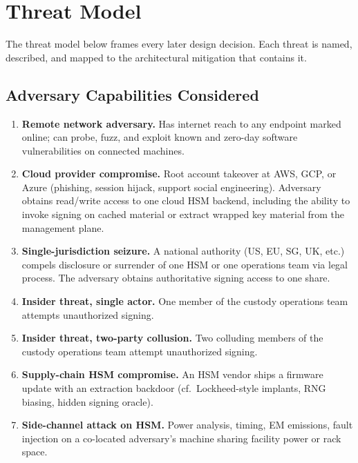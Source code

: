 \section{Threat Model}

\label{sec:threat}

The threat model below frames every later design decision. Each
threat is named, described, and mapped to the architectural mitigation
that contains it.

\subsection{Adversary Capabilities Considered}

\begin{enumerate}[nosep]
\item \textbf{Remote network adversary.} Has internet reach to any
endpoint marked online; can probe, fuzz, and exploit known and
zero-day software vulnerabilities on connected machines.

\item \textbf{Cloud provider compromise.} Root account takeover at
AWS, GCP, or Azure (phishing, session hijack, support social
engineering). Adversary obtains read/write access to one cloud HSM
backend, including the ability to invoke signing on cached material
or extract wrapped key material from the management plane.

\item \textbf{Single-jurisdiction seizure.} A national authority
(US, EU, SG, UK, etc.) compels disclosure or surrender of one HSM
or one operations team via legal process. The adversary obtains
authoritative signing access to one share.

\item \textbf{Insider threat, single actor.} One member of the
custody operations team attempts unauthorized signing.

\item \textbf{Insider threat, two-party collusion.} Two colluding
members of the custody operations team attempt unauthorized signing.

\item \textbf{Supply-chain HSM compromise.} An HSM vendor ships a
firmware update with an extraction backdoor (cf.\ Lockheed-style
implants, RNG biasing, hidden signing oracle).

\item \textbf{Side-channel attack on HSM.} Power analysis, timing,
EM emissions, fault injection on a co-located adversary's machine
sharing facility power or rack space.


\end{enumerate}
